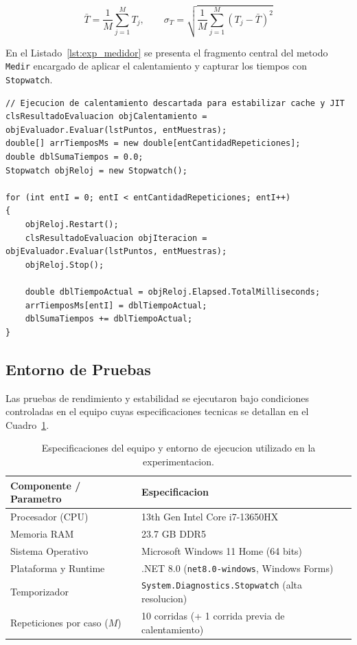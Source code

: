 \begin{equation}
\label{eq:exp_estadisticas}
\bar{T} = \frac{1}{M} \sum_{j=1}^{M} T_j, \qquad \sigma_T = \sqrt{\frac{1}{M} \sum_{j=1}^{M} \left(T_j - \bar{T}\right)^2}
\end{equation}

En el Listado~\ref{lst:exp_medidor} se presenta el fragmento central del metodo \texttt{Medir} encargado de aplicar el calentamiento y capturar los tiempos con \texttt{Stopwatch}.

\begin{lstlisting}[caption={Ciclo de calentamiento y medicion con Stopwatch en clsMedidor.},label={lst:exp_medidor}]
// Ejecucion de calentamiento descartada para estabilizar cache y JIT
clsResultadoEvaluacion objCalentamiento = objEvaluador.Evaluar(lstPuntos, entMuestras);
double[] arrTiemposMs = new double[entCantidadRepeticiones];
double dblSumaTiempos = 0.0;
Stopwatch objReloj = new Stopwatch();

for (int entI = 0; entI < entCantidadRepeticiones; entI++)
{
    objReloj.Restart();
    clsResultadoEvaluacion objIteracion = objEvaluador.Evaluar(lstPuntos, entMuestras);
    objReloj.Stop();

    double dblTiempoActual = objReloj.Elapsed.TotalMilliseconds;
    arrTiemposMs[entI] = dblTiempoActual;
    dblSumaTiempos += dblTiempoActual;
}
\end{lstlisting}

\subsection{Entorno de Pruebas}
\label{subsec:exp_entorno}

Las pruebas de rendimiento y estabilidad se ejecutaron bajo condiciones controladas en el equipo cuyas especificaciones tecnicas se detallan en el Cuadro~\ref{tab:exp_hardware}.

\begin{table}[H]
\centering
\caption{Especificaciones del equipo y entorno de ejecucion utilizado en la experimentacion.}
\label{tab:exp_hardware}
\begin{tabular}{ll}
\toprule
\textbf{Componente / Parametro} & \textbf{Especificacion} \\
\midrule
Procesador (CPU) & 13th Gen Intel Core i7-13650HX \\
Memoria RAM & 23.7 GB DDR5 \\
Sistema Operativo & Microsoft Windows 11 Home (64 bits) \\
Plataforma y Runtime & .NET 8.0 (\texttt{net8.0-windows}, Windows Forms) \\
Temporizador & \texttt{System.Diagnostics.Stopwatch} (alta resolucion) \\
Repeticiones por caso ($M$) & 10 corridas (+ 1 corrida previa de calentamiento) \\
\bottomrule
\end{tabular}
\end{table}

